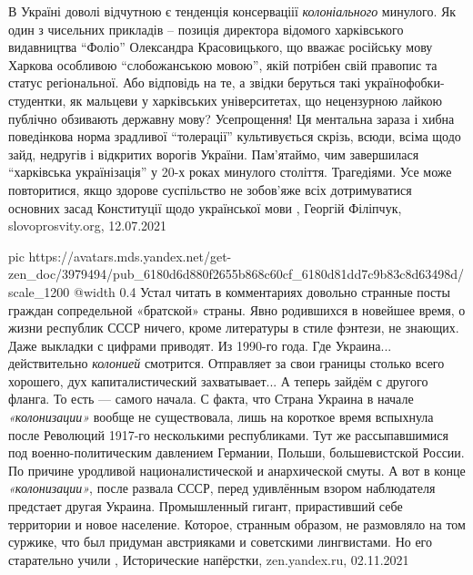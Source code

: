 В Україні доволі відчутною є тенденція консерваціії \emph{колоніального} минулого. Як
один з чисельних прикладів – позиція директора відомого харківського
видавництва \enquote{Фоліо} Олександра Красовицького, що вважає російську мову Харкова
особливою \enquote{слобожанською мовою}, якій потрібен свій правопис та статус
регіональної. Або відповідь на те, а звідки беруться такі
українофобки-студентки, як мальцеви у харківських університетах, що нецензурною
лайкою публічно обзивають державну мову? Усепрощення! Ця ментальна зараза і
хибна поведінкова норма зрадливої \enquote{толерації} культивується скрізь, всюди,
всіма щодо зайд, недругів і відкритих ворогів України. Пам’ятаймо, чим
завершилася \enquote{харківська українізація} у 20-х роках минулого століття.
Трагедіями. Усе може повторитися, якщо здорове суспільство не зобов’яже всіх
дотримуватися основних засад Конституції щодо української мови
, Георгій Філіпчук, slovoprosvity.org, 12.07.2021

\ifcmt
  pic https://avatars.mds.yandex.net/get-zen_doc/3979494/pub_6180d6d880f2655b868c60cf_6180d81dd7c9b83c8d63498d/scale_1200
  @width 0.4
\fi
Устал читать в комментариях довольно странные посты граждан сопредельной
«братской» страны. Явно родившихся в новейшее время, о жизни республик СССР
ничего, кроме литературы в стиле фэнтези, не знающих. Даже выкладки с цифрами
приводят. Из 1990-го года. Где Украина... действительно \emph{колонией} смотрится.
Отправляет за свои границы столько всего хорошего, дух капиталистический
захватывает...  А теперь зайдём с другого фланга. То есть — самого начала. С
факта, что Страна Украина в начале \emph{«колонизации»} вообще не существовала, лишь
на короткое время вспыхнула после Революций 1917-го несколькими республиками.
Тут же рассыпавшимися под военно-политическим давлением Германии, Польши,
большевистской России. По причине уродливой националистической и анархической
смуты.  А вот в конце \emph{«колонизации»}, после развала СССР, перед удивлённым
взором наблюдателя предстает другая Украина. Промышленный гигант, прирастивший
себе территории и новое население. Которое, странным образом, не размовляло на
том суржике, что был придуман австрияками и советскими лингвистами. Но его
старательно учили
, 
Исторические напёрстки, zen.yandex.ru, 02.11.2021
